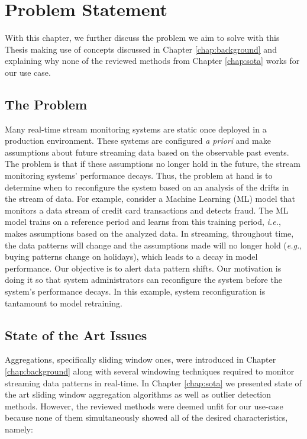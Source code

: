 \chapter{Problem Statement} \label{chap:statement} \minitoc

With this chapter, we further discuss the problem we aim to solve with this Thesis making use of concepts discussed in Chapter \ref{chap:background} and explaining why none of the reviewed methods from Chapter \ref{chap:sota} works for our use case.

\section{The Problem}
Many real-time stream monitoring systems are static once deployed in a production environment. These systems are configured \textit{a priori} and make assumptions about future streaming data based on the observable past events. The problem is that if these assumptions no longer hold in the future, the stream monitoring systems' performance decays. Thus, the problem at hand is to determine when to reconfigure the system based on an analysis of the drifts in the stream of data. For example, consider a Machine Learning (ML) model that monitors a data stream of credit card transactions and detects fraud. The ML model trains on a reference period and learns from this training period, \textit{i.e.}, makes assumptions based on the analyzed data. In streaming, throughout time, the data patterns will change and the assumptions made will no longer hold (\textit{e.g.}, buying patterns change on holidays), which leads to a decay in model performance. Our objective is to alert data pattern shifts. Our motivation is doing it so that system administrators can reconfigure the system before the system's performance decays. In this example, system reconfiguration is tantamount to model retraining.

\section{State of the Art Issues}
Aggregations, specifically sliding window ones, were introduced in Chapter \ref{chap:background} along with several windowing techniques required to monitor streaming data patterns in real-time. In Chapter \ref{chap:sota} we presented state of the art sliding window aggregation algorithms as well as outlier detection methods. However, the reviewed methods were deemed unfit for our use-case because none of them simultaneously showed all of the desired characteristics, namely:

